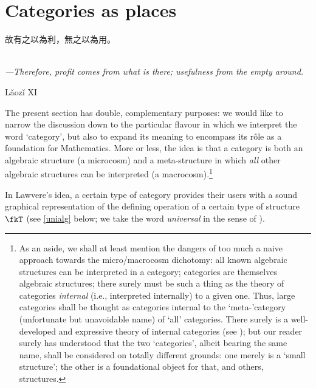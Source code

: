 \section{Categories as places}\label{as_places}
\epigraph{\begin{CJK}{UTF8}{bsmi} 故有之以為利，無之以為用。 \end{CJK} \\[2mm] 
\footnotesize\emph{---Therefore, profit comes from what is there; usefulness from the empty around.}}{Lǎozǐ XI}
The present section has double, complementary purposes: we would like to narrow the discussion down to the particular flavour in which we interpret the word `category', but also to expand its meaning to encompass its r\^ole as a foundation for Mathematics. More or less, the idea is that a category is both an algebraic structure (a microcosm) and a meta\hyp{}structure in which \emph{all} other algebraic structures can be interpreted (a macrocosm).\footnote{As an aside, we shall at least mention the dangers of too much a naive approach towards the micro/macrocosm dichotomy: all known algebraic structures can be interpreted in a category; categories are themselves algebraic structures; there surely must be such a thing as the theory of categories \emph{internal} (i.e., interpreted internally) to a given one. Thus, large categories shall be thought as categories internal to the `meta-'category (unfortunate but unavoidable name) of `all' categories. There surely is a well-developed and expressive theory of internal categories (see \cite[Ch. 8]{Bor1}); but our reader surely has understood that the two `categories', albeit bearing the same name, shall be considered on totally different grounds: one merely is a `small structure'; the other is a foundational object for that, and others, structures.}

In Lawvere's idea, a certain type of category provides their users with a sound graphical representation of the defining operation of a certain type of structure $\fkT$ (see \autoref{unialg} below; we take the word \emph{universal} in the sense of \cite[XV.1]{grillet2007abstract}).

